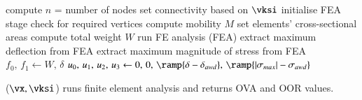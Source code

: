 \begin{Algo} [t] \ALGOSIZE
    \DontPrintSemicolon
    compute $n$ = number of nodes\;
    set connectivity based on $\vksi$\;
    initialise FEA stage\;
    check for required vertices\;
    compute mobility $M$\;
    set elements' cross-sectional areas\;
    compute total weight $W$\;
    run FE analysis (FEA)\;
    extract maximum deflection from FEA\;
    extract maximum magnitude of stress from FEA\;
    $f_0, \, f_1 \gets W, \, \delta$\;
    $u_0,\, u_1,\, u_2,\, u_3 \gets 0,\, 0,\, \ramp{\delta - \delta_{awd}},\, \ramp{|\sigma_{max}| - \sigma_{awd}}$\;
\caption{
    \FnRunFEA($\vx,\vksi$)
    runs finite element analysis and returns OVA and OOR values.
}
\label{alg:femsim}
\end{Algo}
